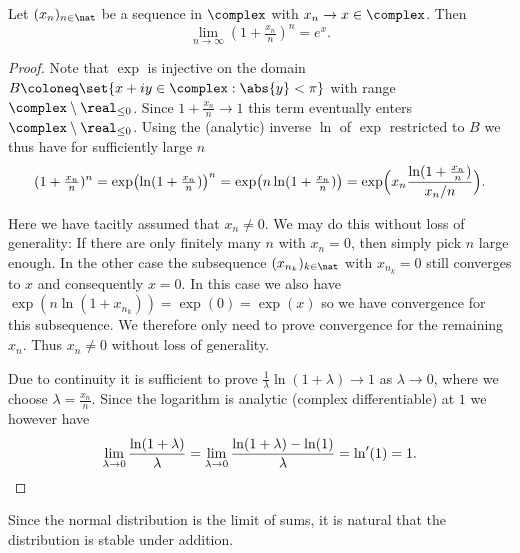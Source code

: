 \begin{lemma}
    \label{lem: compound interest} Let \((x_n)_{n\in \nat}\) be a sequence in \(\complex\)
    with \(x_n \to x\in \complex\). Then
    \[
        \lim_{n\to\infty} (1+\tfrac{x_n}n)^n = e^{x}.
    \]
\end{lemma}
\begin{proof}
    Note that \(\exp\) is injective on the domain \(B\coloneq\set{x+iy\in \complex: \abs{y} < \pi}\)
    with range \(\complex\setminus \real_{\le 0}\). Since \(1+\frac{x_n}n \to
    1\) this term eventually enters \(\complex\setminus \real_{\le
    0}\). Using the (analytic) inverse \(\ln\) of \(\exp\) restricted to \(B\)
    we thus have for sufficiently large \(n\)
    \[
        (1 + \tfrac{x_n}n)^n
        = \exp\bigl(\ln(1 + \tfrac{x_n}n)\bigr)^n
        = \exp\bigl(n \ln(1 + \tfrac{x_n}n)\bigr)
        = \exp\Bigl(x_n \frac{\ln(1 + \tfrac{x_n}n)}{x_n/n}\Bigr).
    \]
    \vspace*{-2ex}
    \begin{mdframed}[innertopmargin=0pt,innerbottommargin=0pt,rightline=false,topline=false,bottomline=false]
    Here we have tacitly assumed that \(x_n \neq 0\). We may
    do this without loss of generality:
    If there are only finitely many \(n\) with \(x_n=0\), then
    simply pick \(n\) large enough. In the other case
    the subsequence \((x_{n_k})_{k\in \nat}\) with \(x_{n_k} = 0\) still
    converges to \(x\) and consequently \(x=0\). In this case
    we also have \(\exp(n \ln(1+x_{n_k})) = \exp(0)= \exp(x)\) so
    we have convergence for this subsequence. We therefore only need
    to prove convergence for the remaining \(x_n\).
    Thus \(x_n\neq 0\) without loss of generality.
    \end{mdframed}
    Due to continuity it is sufficient to prove \(\frac1\lambda\ln(1 +
    \lambda) \to 1\) as \(\lambda \to 0\), where we choose \(\lambda = \frac{x_n}n\). Since the logarithm is analytic
    (complex differentiable)
    at \(1\) we however have
    \[
        \lim_{\lambda \to 0} \frac{\ln(1 + \lambda)}{\lambda}
        = \lim_{\lambda \to 0} \frac{\ln(1 + \lambda) - \ln(1)}{\lambda}
        = \ln'(1)
        = 1. \qedhere
    \]
\end{proof}

Since the normal distribution is the limit of sums, it is natural that the
distribution is stable under addition.

